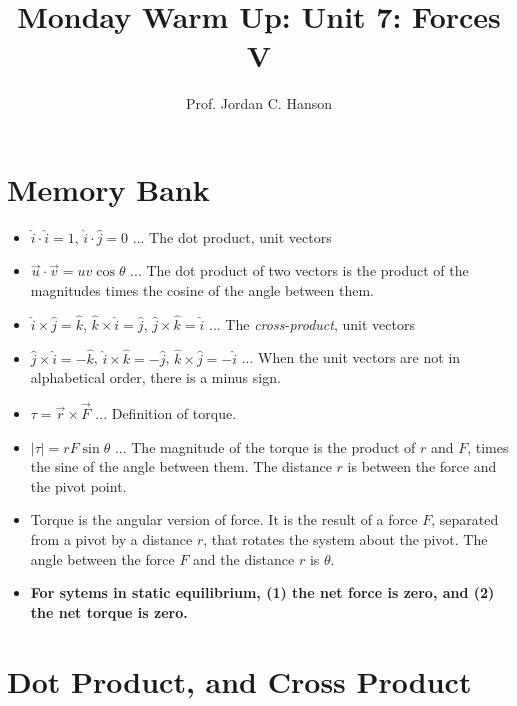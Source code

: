 \documentclass{article}
\begin{document}
\twocolumn

\title{Monday Warm Up: Unit 7: Forces V}
\author{Prof. Jordan C. Hanson}

\maketitle

\section{Memory Bank}

\begin{itemize}
\item $\hat{i} \cdot \hat{i} = 1$, $\hat{i} \cdot \hat{j} = 0$ ... The dot product, unit vectors
\item $\vec{u} \cdot \vec{v} = uv\cos\theta$ ... The dot product of two vectors is the product of the magnitudes times the cosine of the angle between them.
\item $\hat{i} \times \hat{j} = \hat{k}$, $\hat{k} \times \hat{i} = \hat{j}$, $\hat{j} \times \hat{k} = \hat{i}$ ... The \textit{cross-product}, unit vectors
\item $\hat{j} \times \hat{i} = -\hat{k}$, $\hat{i} \times \hat{k} = -\hat{j}$, $\hat{k} \times \hat{j} = -\hat{i}$ ... When the unit vectors are not in alphabetical order, there is a minus sign.
\item $\tau = \vec{r} \times \vec{F}$ ... Definition of torque.
\item $|\tau| = rF\sin\theta$ ... The magnitude of the torque is the product of $r$ and $F$, times the sine of the angle between them.  The distance $r$ is between the force and the pivot point.
\item Torque is the angular version of force.  It is the result of a force $F$, separated from a pivot by a distance $r$, that rotates the system about the pivot.  The angle between the force $F$ and the distance $r$ is $\theta$.
\item \textbf{For sytems in static equilibrium, (1) the net force is zero, and (2) the net torque is zero.}
\end{itemize}

\section{Dot Product, and Cross Product}
\end{document}

